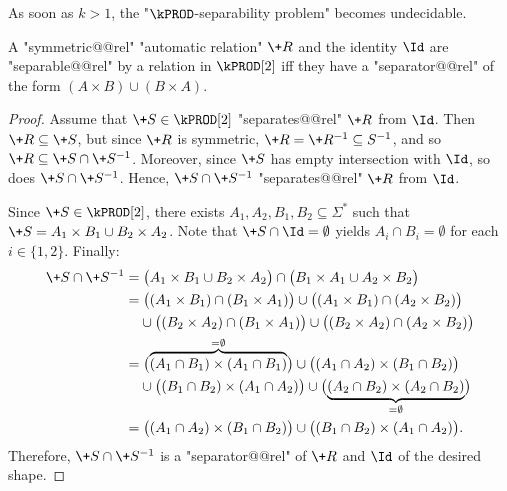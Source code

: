 As soon as $k>1$, the "$\kPROD$-separability problem" becomes undecidable.

\begin{lemma}
    A "symmetric@@rel" "automatic relation" $\+R$ and the identity $\Id$ are "separable@@rel" by a relation in $\kPROD[2]$ iff they have a "separator@@rel" of the form $(A \times B) \cup (B \times A)$.
\end{lemma}
\begin{proof}
    Assume that $\+S \in \kPROD[2]$ "separates@@rel" $\+R$ from $\Id$.
    Then $\+R \subseteq \+S$, but since $\+R$ is symmetric, $\+R = \+R^{-1} \subseteq S^{-1}$,
    and so $\+R \subseteq \+S \cap \+S^{-1}$.
    Moreover, since $\+S$ has empty intersection with $\Id$, so does $\+S \cap \+S^{-1}$.
    Hence, $\+S \cap \+S^{-1}$ "separates@@rel" $\+R$ from $\Id$.

    Since $\+S \in \kPROD[2]$, there exists $A_1,A_2,B_1,B_2 \subseteq \Sigma^*$ such that
    $\+S = A_1 \times B_1 \cup B_2 \times A_2$.
    Note that $\+S \cap \Id = \emptyset$ yields $A_i \cap B_i = \emptyset$ for each $i \in \{1,2\}$.
    Finally:
    \begin{align*}
        \+S \cap \+S^{-1} &
        =
            \bigl( A_1 \times B_1 \cup B_2 \times A_2 \bigr)
            \cap \bigl( B_1 \times A_1 \cup A_2 \times B_2 \bigr) \\
        &
        =
            \bigl( (A_1 \times B_1) \cap (B_1 \times A_1) \bigr)
            \cup \bigl( (A_1 \times B_1) \cap (A_2 \times B_2) \bigr) \\
        &
        \hphantom{=\;} \cup \bigl( (B_2 \times A_2) \cap (B_1 \times A_1) \bigr)
            \cup \bigl( (B_2 \times A_2) \cap (A_2 \times B_2) \bigr) \\
        &
        =
            \bigl( \overbrace{(A_1 \cap B_1) \times (A_1 \cap B_1)}^{= \emptyset} \bigr)
            \cup \bigl( (A_1 \cap A_2) \times (B_1 \cap B_2) \bigr) \\
        &
        \hphantom{=\;} \cup \bigl( (B_1 \cap B_2) \times (A_1 \cap A_2) \bigr)
            \cup \bigl( \underbrace{(A_2 \cap B_2) \times (A_2 \cap B_2)}_{= \emptyset} \bigr)\\
        &
        = \bigl( (A_1 \cap A_2) \times (B_1 \cap B_2) \bigr)
            \cup \bigl( (B_1 \cap B_2) \times (A_1 \cap A_2) \bigr).
    \end{align*}
    Therefore, $\+S \cap \+S^{-1}$ is a "separator@@rel" of $\+R$ and $\Id$ of the desired shape.
\end{proof}

